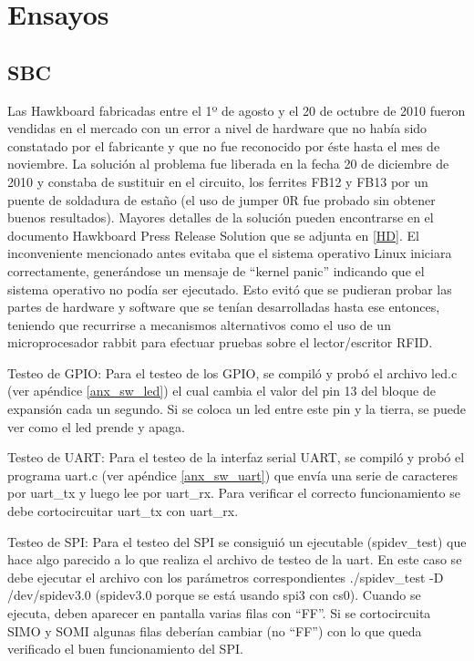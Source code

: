 \chapter{Ensayos}

\section{SBC}
Las Hawkboard fabricadas entre el 1º de agosto y el 20 de octubre de 2010 fueron vendidas en el mercado con 
un error a nivel de hardware que no había sido constatado por el fabricante y que no fue reconocido por éste
hasta el mes de noviembre. La solución al problema fue liberada en la fecha 20 de diciembre de 2010 y constaba de sustituir en el circuito, los ferrites FB12 y FB13 por un puente de soldadura de estaño (el uso de jumper 0R fue probado sin obtener buenos resultados). Mayores detalles de la solución pueden encontrarse en el documento Hawkboard Press Release Solution que se adjunta en \ref{HD}.
El inconveniente mencionado antes evitaba que el sistema operativo Linux iniciara correctamente, generándose un mensaje de “kernel panic” indicando que el sistema operativo no podía ser ejecutado. Esto evitó que se pudieran probar las partes de hardware y software que se tenían desarrolladas hasta ese entonces, teniendo que recurrirse a mecanismos alternativos como el uso de un microprocesador rabbit para efectuar pruebas sobre el lector/escritor RFID.

\bigskip
\bigskip
{}

Testeo de GPIO: Para el testeo de los GPIO, se compiló y probó el archivo led.c (ver apéndice \ref{anx_sw_led}) el cual cambia el valor del pin 13 del bloque de expansión cada un segundo. Si se coloca un led entre este pin y la tierra, se puede ver como el led prende y apaga.

\bigskip
Testeo de UART: Para el testeo de la interfaz serial UART, se compiló y probó el programa uart.c
(ver apéndice \ref{anx_sw_uart}) que envía una serie de caracteres por uart\_tx y luego lee por uart\_rx. Para verificar
el correcto funcionamiento se debe cortocircuitar uart\_tx con uart\_rx.

\bigskip
Testeo de SPI: Para el testeo del SPI se consiguió un ejecutable (spidev\_test) que hace algo parecido
a lo que realiza el archivo de testeo de la uart. En este caso se debe ejecutar el archivo con los
parámetros correspondientes ./spidev\_test -D /dev/spidev3.0 (spidev3.0 porque se está usando spi3
con cs0). Cuando se ejecuta, deben aparecer en pantalla varias filas con “FF”. Si
se cortocircuita SIMO y SOMI algunas filas deberían cambiar (no “FF”) con lo que queda
verificado el buen funcionamiento del SPI.


